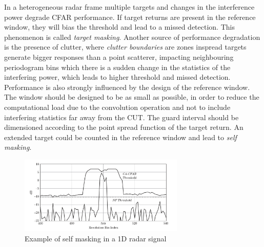 In a heterogeneous radar frame multiple targets and changes in the interference power degrade CFAR performance. If target returns are present in the reference window, they will bias the threshold and lead to a missed detection. This phenomenon is called \textit{target masking}. Another source of performance degradation is the presence of clutter, where \textit{clutter boundaries} are zones inspread targets generate
bigger responses than a point scatterer, impacting
neighbouring periodogram bins which there is a sudden change in the statistics of the interfering power, which leads to higher threshold and missed detection.
Performance is also strongly influenced by the design of the reference window. The window should be designed to be as small as possible, in order to reduce the computational load due to the convolution operation and not to include interfering statistics far away from the CUT. The guard interval should be dimensioned according to the point spread function of the target return. An extended target could be counted in the reference window and lead to \textit{self masking}.

	\begin{figure}[H]
		\centering
		\includegraphics[width=0.7\textwidth]{Images/radar_detect_threshold/self_masking_Richards2010.png}
		\caption{Example of self masking in a 1D radar signal \cite{Richards_Scheer_Holm_2010}}
		\label{fig:self_masking_Richards2010}
	\end{figure}

